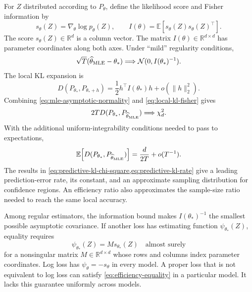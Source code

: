 \documentclass[11pt,twoside]{article}
\newcommand{\R}{\mathbb R}
\newcommand{\KL}{D}
\theoremstyle{definition}
\theoremstyle{remark}
\begin{document}
For $Z$ distributed according to $P_\theta$, define the likelihood score and
Fisher information by
\begin{equation}
s_\theta(Z)=\nabla_\theta\log p_\theta(Z),
\qquad
I(\theta)=\mathbb E[s_\theta(Z)s_\theta(Z)^\top].
\label{eq:score-fisher}
\end{equation}
The score $s_\theta(Z)\in\R^d$ is a column vector. The matrix
$I(\theta)\in\R^{d\times d}$ has parameter coordinates along both axes.
Under ``mild'' regularity conditions,
\begin{equation}
\sqrt T(\widehat\theta_{\rm MLE}-\theta_*)
\Longrightarrow
\mathcal N(0,I(\theta_*)^{-1}).
\label{eq:mle-asymptotic-normality}
\end{equation}
The local KL expansion is
\begin{equation}
\KL(P_{\theta_*}, P_{\theta_*+h})
=\frac12h^\top I(\theta_*)h+o(\lVert h\rVert_2^2).
\label{eq:local-kl-fisher}
\end{equation}
Combining \cref{eq:mle-asymptotic-normality} and
\cref{eq:local-kl-fisher} gives
\begin{equation}
2T\KL(P_{\theta_*}, P_{\widehat\theta_{\rm MLE}})
\Longrightarrow\chi_d^2.
\label{eq:predictive-kl-chi-square}
\end{equation}
With the additional uniform-integrability conditions needed to pass to
expectations,
\begin{equation}
\mathbb E\!\left[
\KL(P_{\theta_*}, P_{\widehat\theta_{\rm MLE}})
\right]
=\frac{d}{2T}+o(T^{-1}).
\label{eq:predictive-kl-rate}
\end{equation}
The results in \cref{eq:predictive-kl-chi-square,eq:predictive-kl-rate} give a
leading prediction-error rate, its
constant, and an approximate sampling distribution for confidence regions.
An efficiency ratio also approximates the sample-size ratio needed to reach
the same local accuracy.

Among regular estimators, the information bound makes
$I(\theta_*)^{-1}$ the smallest possible asymptotic covariance. If another
loss has estimating function $\psi_{\theta_*}(Z)$, equality requires
\begin{equation}
\psi_{\theta_*}(Z)=M s_{\theta_*}(Z)
\quad\text{almost surely}
\label{eq:efficiency-equality}
\end{equation}
for a nonsingular matrix $M\in\R^{d\times d}$ whose rows and columns index
parameter coordinates. Log loss has
$\psi_\theta=-s_\theta$ in every model. A proper loss that is not equivalent
to log loss can satisfy \cref{eq:efficiency-equality} in a particular model.
It lacks this guarantee uniformly across models.
\end{document}
